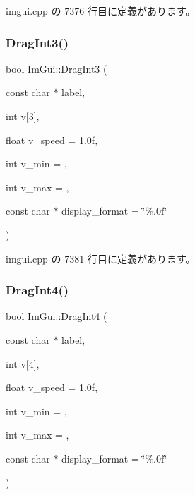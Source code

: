  imgui.\+cpp の 7376 行目に定義があります。

\mbox{\label{namespace_im_gui_ab0b40f3d0631113d54fa8e0c90ed4f77}} 
\subsubsection{\texorpdfstring{Drag\+Int3()}{DragInt3()}}
{\footnotesize\ttfamily bool Im\+Gui\+::\+Drag\+Int3 (\begin{DoxyParamCaption}\item[{const char $\ast$}]{label,  }\item[{int}]{v\mbox{[}3\mbox{]},  }\item[{float}]{v\+\_\+speed = {\ttfamily 1.0f},  }\item[{int}]{v\+\_\+min = {},  }\item[{int}]{v\+\_\+max = {},  }\item[{const char $\ast$}]{display\+\_\+format = {\ttfamily \char`\"{}\%.0f\char`\"{}} }\end{DoxyParamCaption})}



 imgui.\+cpp の 7381 行目に定義があります。

\mbox{\label{namespace_im_gui_a65b6e42ba7a4aa73fd3e1dc74f93d180}} 
\subsubsection{\texorpdfstring{Drag\+Int4()}{DragInt4()}}
{\footnotesize\ttfamily bool Im\+Gui\+::\+Drag\+Int4 (\begin{DoxyParamCaption}\item[{const char $\ast$}]{label,  }\item[{int}]{v\mbox{[}4\mbox{]},  }\item[{float}]{v\+\_\+speed = {\ttfamily 1.0f},  }\item[{int}]{v\+\_\+min = {},  }\item[{int}]{v\+\_\+max = {},  }\item[{const char $\ast$}]{display\+\_\+format = {\ttfamily \char`\"{}\%.0f\char`\"{}} }\end{DoxyParamCaption})}




